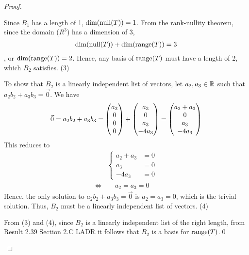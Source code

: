 \begin{proof}
\begin{enumerate}[(i)]
        Since $B_1$ has a length of 1, $\textnormal{dim}(\textnormal{null}(T))=1$. From the rank-nullity theorem, since the domain ($R^3$) has a dimension of 3,
        \[
            \begin{aligned}
                \textnormal{dim}(\textnormal{null}(T))+\textnormal{dim}(\textnormal{range}(T))=3
            \end{aligned}
        \]
        , or $\textnormal{dim}(\textnormal{range}(T))=2$. Hence, any basis of $\textnormal{range}(T)$ must have a length of 2, which $B_2$ satisfies. (3)

        To show that $B_2$ is a linearly independent list of vectors, let $a_2,a_3\in\mathbb R$ such that $a_2b_2+a_3b_3=\vec{0}$. We have 
        \[
            \begin{aligned}
                \vec{0} = a_2b_2+a_3b_3 = \begin{pmatrix} a_2\\ 0\\0 \\ 0\end{pmatrix}+\begin{pmatrix} a_3\\ 0\\a_3 \\ -4a_3\end{pmatrix}= \begin{pmatrix} a_2+a_3\\ 0\\a_3 \\ -4a_3\end{pmatrix}      
            \end{aligned}
        \]
        This reduces to 
        \begin{align*}
            &\begin{cases}
                a_2+a_3 &= 0\\
                a_3 &= 0\\
                -4a_3 &= 0
            \end{cases}\\
            \iff&\quad \, a_2=a_3=0
        \end{align*}
        Hence, the only solution to $a_2b_2+a_3b_3=\vec{0}$ is $a_2=a_3=0$, which is the trivial solution. Thus, $B_2$ must be a linearly independent list of vectors. (4)

        From (3) and (4), since $B_2$ is a linearly independent list of the right length, from Result 2.39 Section 2.C LADR it follows that $B_2$ is a basis for $\textnormal{range}(T)$.\qed
    \end{enumerate}
    \renewcommand{\qedsymbol}{}
\end{proof}